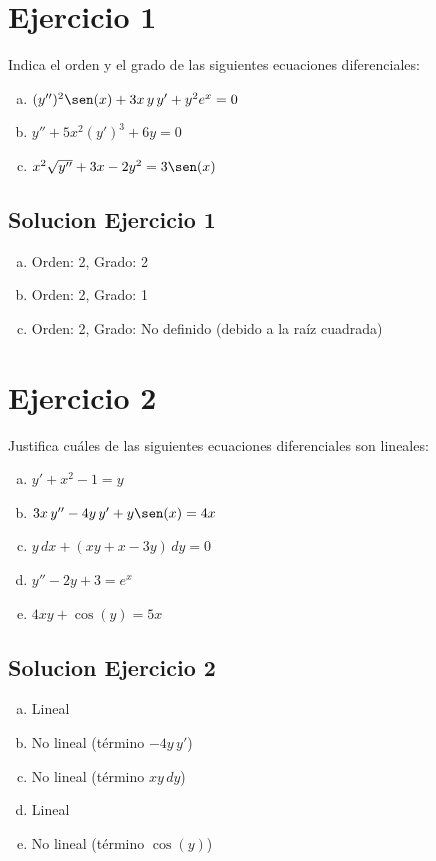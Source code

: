 \documentclass[12pt]{article}
\begin{document}
\section*{Ejercicio 1}

Indica el orden y el grado de las siguientes ecuaciones diferenciales:

\begin{enumerate}[a)]
\item $(y'')^2 \sen(x) + 3x\,y\,y' + y^2 e^x = 0$
\item $y'' + 5x^2 (y')^3 + 6y = 0$
\item $x^2 \sqrt{y''} + 3x - 2y^2 = 3\sen(x)$
\end{enumerate}

\subsection*{Solucion Ejercicio 1}

\begin{enumerate}[a)]
\item Orden: 2, Grado: 2
\item Orden: 2, Grado: 1
\item Orden: 2, Grado: No definido (debido a la raíz cuadrada)
\end{enumerate}

\section*{Ejercicio 2}

Justifica cuáles de las siguientes ecuaciones diferenciales son lineales:

\begin{enumerate}[a)]
\item $y' + x^2 - 1 = y$
\item $3x\,y'' - 4y\,y' + y\sen(x) = 4x$
\item $y\,dx + (xy + x - 3y)\,dy = 0$
\item $y'' - 2y + 3 = e^x$
\item $4xy + \cos(y) = 5x$
\end{enumerate}

\subsection*{Solucion Ejercicio 2}
\begin{enumerate}[a)]
\item Lineal
\item No lineal (término $-4y\,y'$)
\item No lineal (término $xy\,dy$)
\item Lineal
\item No lineal (término $\cos(y)$)
\end{enumerate}
\end{document}
